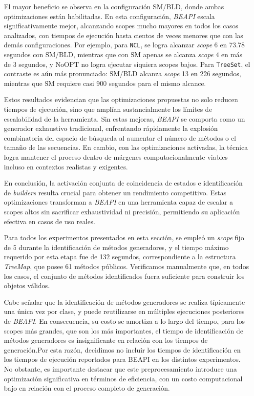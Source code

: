 El mayor beneficio se observa en la configuración \textsf{SM/BLD}, donde ambas optimizaciones están 
habilitadas. En esta configuración, \emph{BEAPI} escala significativamente mejor, alcanzando scopes 
mucho mayores en todos los casos analizados, con tiempos de ejecución hasta cientos de veces menores 
que con las demás configuraciones. Por ejemplo, para \texttt{NCL}, se logra alcanzar \textit{scope} 6 
en 73.78 segundos con \textsf{SM/BLD}, mientras que con \textsf{SM} apenas se alcanza \textit{scope} 4 
en más de 3 segundos, y \textsf{NoOPT} no logra ejecutar siquiera scopes bajos. Para \texttt{TreeSet}, 
el contraste es aún más pronunciado: \textsf{SM/BLD} alcanza \textit{scope} 13 en 226 segundos, mientras 
que \textsf{SM} requiere casi 900 segundos para el mismo alcance.

Estos resultados evidencian que las optimizaciones propuestas no solo reducen tiempos de ejecución, 
sino que amplían sustancialmente los límites de escalabilidad de la herramienta. Sin estas mejoras, 
\emph{BEAPI} se comporta como un generador exhaustivo tradicional, enfrentando rápidamente la explosión 
combinatoria del espacio de búsqueda al aumentar el número de métodos o el tamaño de las secuencias. 
En cambio, con las optimizaciones activadas, la técnica logra mantener el proceso dentro de márgenes 
computacionalmente viables incluso en contextos realistas y exigentes.

En conclusión, la activación conjunta de coincidencia de estados e identificación de \emph{builders} 
resulta crucial para obtener un rendimiento competitivo. Estas optimizaciones transforman a \emph{BEAPI} 
en una herramienta capaz de escalar a scopes altos sin sacrificar exhaustividad ni precisión, 
permitiendo su aplicación efectiva en casos de uso reales.

Para todos los experimentos presentados en esta sección, se empleó un \emph{scope} fijo de 5 durante la 
identificación de métodos generadores, y el tiempo máximo requerido por esta etapa fue de 132 segundos, 
correspondiente a la estructura \emph{TreeMap}, que posee 61 métodos públicos. Verificamos manualmente que, 
en todos los casos, el conjunto de métodos identificados fuera suficiente para construir los objetos válidos.

Cabe señalar que la identificación de métodos generadores se realiza típicamente una única vez por clase, 
y puede reutilizarse en múltiples ejecuciones posteriores de \emph{BEAPI}. En consecuencia, su costo se 
amortiza a lo largo del tiempo, para los scopes más grandes, que son los más importantes, el tiempo de identificación de 
métodos generadores es insignificante en relación con los tiempos de generación.Por esta razón, decidimos no incluir los tiempos de identificación 
en los tiempos de ejecución reportados para \textsf{BEAPI} en los distintos experimentos.
No obstante, es importante destacar que este preprocesamiento introduce una optimización significativa en 
términos de eficiencia, con un costo computacional bajo en relación con el proceso completo de generación. 


